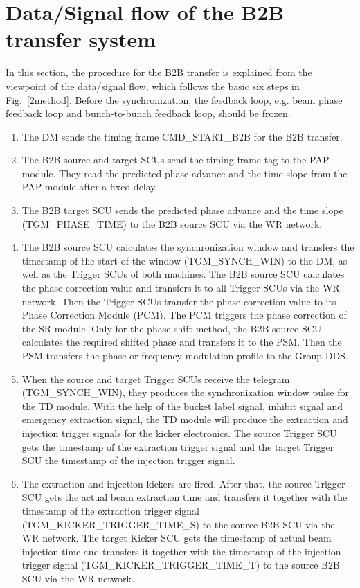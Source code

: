 \section{Data/Signal flow of the B2B transfer system}
In this section, the procedure for the B2B transfer is explained from the viewpoint of the data/signal flow, which follows the basic six steps in Fig.~\ref{2method}. Before the synchronization, the feedback loop, e.g. beam phase feedback loop and bunch-to-bunch feedback loop, should be frozen. 

\begin{enumerate}
\item The DM sends the timing frame CMD\_START\_B2B for the B2B transfer. 

\item  The B2B source and target SCUs send the timing frame tag to the PAP module. They read the predicted phase advance and the time slope from the PAP module after a fixed delay. 

\item  The B2B target SCU sends the predicted phase advance and the time slope (TGM\_PHASE\_TIME) to the B2B source SCU via the WR network. 

\item  The B2B source SCU calculates the synchronization window and transfers the timestamp of the start of the window (TGM\_SYNCH\_WIN) to the DM, as well as the Trigger SCUs of both machines.
The B2B source SCU calculates the phase correction value and transfers it to all Trigger SCUs via the WR network. Then the Trigger SCUs transfer the phase correction value to its Phase Correction Module (\gls{PCM}). The PCM triggers the phase correction of the SR module. 
Only for the phase shift method, the B2B source SCU calculates the required shifted phase and transfers it to the PSM. Then the PSM transfers the phase or frequency modulation profile to the Group DDS.  

\item  When the source and target Trigger SCUs receive the telegram (TGM\_SYNCH\_WIN), they produces the synchronization window pulse for the TD module. With the help of the bucket label signal, inhibit signal and emergency extraction signal, the TD module will produce the extraction and injection trigger signals for the kicker electronics.  
The source Trigger SCU gets the timestamp of the extraction trigger signal and the target Trigger SCU the timestamp of the injection trigger signal.
\item  The extraction and injection kickers are fired. 
After that, the source Trigger SCU gets the actual beam extraction time and transfers it together with the timestamp of the extraction trigger signal (TGM\_KICKER\_TRIGGER\_TIME\_S) to the source B2B SCU via the WR network.
The target Kicker SCU gets the timestamp of actual beam injection time and transfers it together with the timestamp of the injection trigger signal (TGM\_KICKER\_TRIGGER\_TIME\_T) to the source B2B SCU via the WR network.


\end{enumerate}
